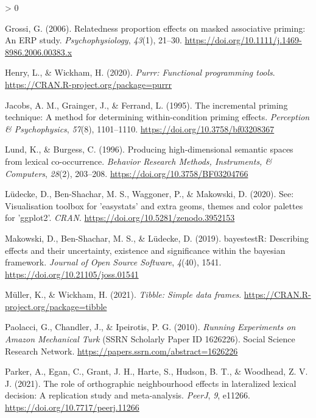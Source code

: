 \documentclass[
  english,
  man,floatsintext]{apa6}
\newlength{\cslhangindent}
\newenvironment{CSLReferences}[2] %
 {%
  \setlength{\parindent}{0pt}
  \ifodd #1 \everypar{\setlength{\hangindent}{\cslhangindent}}\ignorespaces\fi
  \ifnum #2 > 0
  \setlength{\parskip}{#2\baselineskip}
  \fi
 }%
 {}
\begin{document}
\begin{CSLReferences}{1}{0}
\leavevmode\hypertarget{ref-grossi2006relatedness}{}%
Grossi, G. (2006). Relatedness proportion effects on masked associative priming: An {ERP} study. \emph{Psychophysiology}, \emph{43}(1), 21--30. \url{https://doi.org/10.1111/j.1469-8986.2006.00383.x}

\leavevmode\hypertarget{ref-R-purrr}{}%
Henry, L., \& Wickham, H. (2020). \emph{Purrr: Functional programming tools}. \url{https://CRAN.R-project.org/package=purrr}

\leavevmode\hypertarget{ref-Jacobs_1995}{}%
Jacobs, A. M., Grainger, J., \& Ferrand, L. (1995). The incremental priming technique: A method for determining within-condition priming effects. \emph{Perception {\&} Psychophysics}, \emph{57}(8), 1101--1110. \url{https://doi.org/10.3758/bf03208367}

\leavevmode\hypertarget{ref-lund1996}{}%
Lund, K., \& Burgess, C. (1996). Producing high-dimensional semantic spaces from lexical co-occurrence. \emph{Behavior Research Methods, Instruments, \& Computers}, \emph{28}(2), 203--208. \url{https://doi.org/10.3758/BF03204766}

\leavevmode\hypertarget{ref-R-see}{}%
Lüdecke, D., Ben-Shachar, M. S., Waggoner, P., \& Makowski, D. (2020). See: Visualisation toolbox for 'easystats' and extra geoms, themes and color palettes for 'ggplot2'. \emph{CRAN}. \url{https://doi.org/10.5281/zenodo.3952153}

\leavevmode\hypertarget{ref-R-bayestestR}{}%
Makowski, D., Ben-Shachar, M. S., \& Lüdecke, D. (2019). bayestestR: Describing effects and their uncertainty, existence and significance within the bayesian framework. \emph{Journal of Open Source Software}, \emph{4}(40), 1541. \url{https://doi.org/10.21105/joss.01541}

\leavevmode\hypertarget{ref-R-tibble}{}%
Müller, K., \& Wickham, H. (2021). \emph{Tibble: Simple data frames}. \url{https://CRAN.R-project.org/package=tibble}

\leavevmode\hypertarget{ref-paolacciRunningExperimentsAmazon2010}{}%
Paolacci, G., Chandler, J., \& Ipeirotis, P. G. (2010). \emph{Running {Experiments} on {Amazon Mechanical Turk}} (SSRN Scholarly Paper ID 1626226). {Social Science Research Network}. \url{https://papers.ssrn.com/abstract=1626226}

\leavevmode\hypertarget{ref-Parker_2021}{}%
Parker, A., Egan, C., Grant, J. H., Harte, S., Hudson, B. T., \& Woodhead, Z. V. J. (2021). The role of orthographic neighbourhood effects in lateralized lexical decision: A replication study and meta-analysis. \emph{{PeerJ}}, \emph{9}, e11266. \url{https://doi.org/10.7717/peerj.11266}


\end{CSLReferences}
\end{document}
